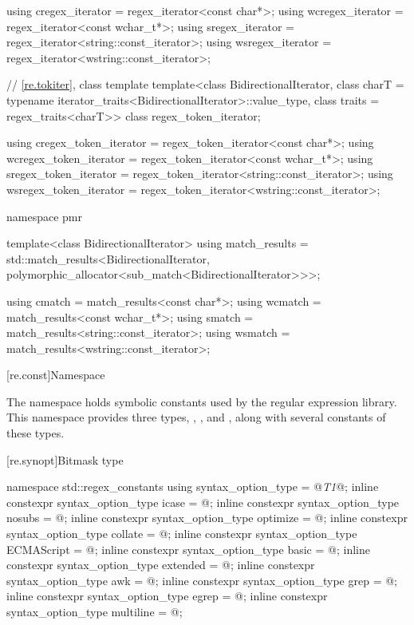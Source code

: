 \begin{codeblock}
{  using cregex_iterator  = regex_iterator<const char*>;
  using wcregex_iterator = regex_iterator<const wchar_t*>;
  using sregex_iterator  = regex_iterator<string::const_iterator>;
  using wsregex_iterator = regex_iterator<wstring::const_iterator>;

  // \ref{re.tokiter}, class template 
  template<class BidirectionalIterator,
            class charT = typename iterator_traits<BidirectionalIterator>::value_type,
            class traits = regex_traits<charT>>
    class regex_token_iterator;

  using cregex_token_iterator  = regex_token_iterator<const char*>;
  using wcregex_token_iterator = regex_token_iterator<const wchar_t*>;
  using sregex_token_iterator  = regex_token_iterator<string::const_iterator>;
  using wsregex_token_iterator = regex_token_iterator<wstring::const_iterator>;

  namespace pmr {
    template<class BidirectionalIterator>
      using match_results =
        std::match_results<BidirectionalIterator,
                           polymorphic_allocator<sub_match<BidirectionalIterator>>>;

    using cmatch  = match_results<const char*>;
    using wcmatch = match_results<const wchar_t*>;
    using smatch  = match_results<string::const_iterator>;
    using wsmatch = match_results<wstring::const_iterator>;
  }
}
\end{codeblock}

[re.const]{Namespace }

\pnum
{}%
The namespace  holds
symbolic constants used by the regular expression library.  This
namespace provides three types, ,
, and , along with several
constants of these types.

[re.synopt]{Bitmask type }
%
%
\begin{codeblock}
namespace std::regex_constants {
  using syntax_option_type = @\textit{T1}@;
  inline constexpr syntax_option_type icase = @\unspec@;
  inline constexpr syntax_option_type nosubs = @\unspec@;
  inline constexpr syntax_option_type optimize = @\unspec@;
  inline constexpr syntax_option_type collate = @\unspec@;
  inline constexpr syntax_option_type ECMAScript = @\unspec@;
  inline constexpr syntax_option_type basic = @\unspec@;
  inline constexpr syntax_option_type extended = @\unspec@;
  inline constexpr syntax_option_type awk = @\unspec@;
  inline constexpr syntax_option_type grep = @\unspec@;
  inline constexpr syntax_option_type egrep = @\unspec@;
  inline constexpr syntax_option_type multiline = @\unspec@;
}
\end{codeblock}


